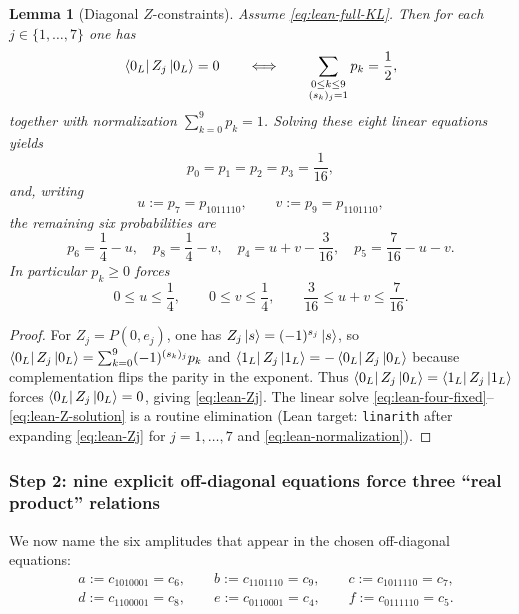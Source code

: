 \documentclass[11pt]{article}
\newtheorem{lemma}{Lemma}
\begin{document}
\begin{lemma}[Diagonal $Z$-constraints]
\label{lem:lean-Z-system}
Assume \eqref{eq:lean-full-KL}. Then for each $j\in\{1,\dots,7\}$ one has
\begin{equation}
\bra{0_L}Z_j\ket{0_L}=0
\qquad\Longleftrightarrow\qquad
\sum_{\substack{0\le k\le 9\\ (s_k)_j=1}} p_k=\frac12,
\label{eq:lean-Zj}
\end{equation}
together with normalization $\sum_{k=0}^9 p_k=1$.
Solving these eight linear equations yields
\begin{equation}
p_0=p_1=p_2=p_3=\frac{1}{16},
\label{eq:lean-four-fixed}
\end{equation}
and, writing
\[
u:=p_7=p_{1011110},\qquad v:=p_9=p_{1101110},
\]
the remaining six probabilities are
\begin{equation}
p_6=\frac14-u,\quad p_8=\frac14-v,\quad
p_4=u+v-\frac{3}{16},\quad p_5=\frac{7}{16}-u-v.
\label{eq:lean-Z-solution}
\end{equation}
In particular $p_k\ge 0$ forces
\[
0\le u\le \frac14,\qquad 0\le v\le \frac14,\qquad \frac{3}{16}\le u+v\le \frac{7}{16}.
\]
\end{lemma}

\begin{proof}
For $Z_j=P(0,e_j)$, one has $Z_j\ket{s}=(-1)^{s_j}\ket{s}$, so
$\bra{0_L}Z_j\ket{0_L}=\sum_{k=0}^9 (-1)^{(s_k)_j}p_k$ and $\bra{1_L}Z_j\ket{1_L}=-\bra{0_L}Z_j\ket{0_L}$ because complementation flips the parity in the exponent.
Thus $\bra{0_L}Z_j\ket{0_L}=\bra{1_L}Z_j\ket{1_L}$ forces $\bra{0_L}Z_j\ket{0_L}=0$, giving \eqref{eq:lean-Zj}.
The linear solve \eqref{eq:lean-four-fixed}--\eqref{eq:lean-Z-solution} is a routine elimination (Lean target: \texttt{linarith} after expanding \eqref{eq:lean-Zj} for $j=1,\dots,7$ and \eqref{eq:lean-normalization}). 
\end{proof}

\subsubsection*{Step 2: nine explicit off-diagonal equations force three ``real product'' relations}

We now name the six amplitudes that appear in the chosen off-diagonal equations:
\[
\begin{aligned}
&a:=c_{1010001}=c_6,\qquad b:=c_{1101110}=c_9,\qquad c:=c_{1011110}=c_7,\\
&d:=c_{1100001}=c_8,\qquad e:=c_{0110001}=c_4,\qquad f:=c_{0111110}=c_5.
\end{aligned}
\]
\end{document}
